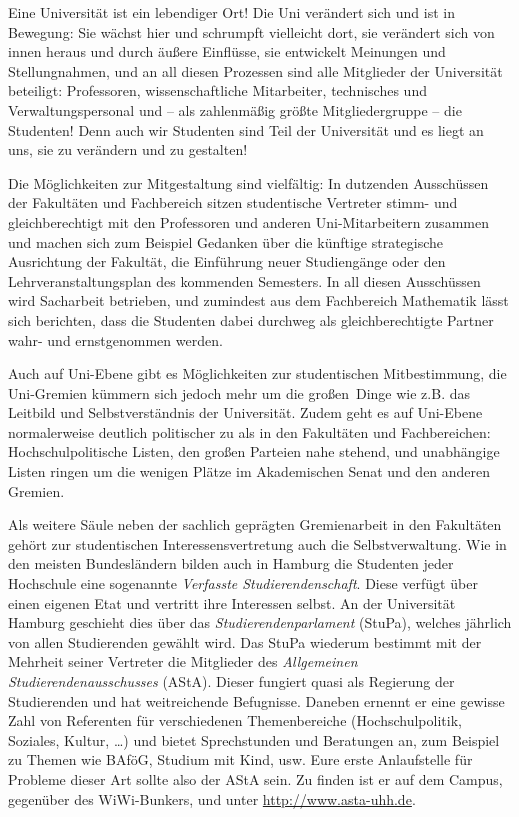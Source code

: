 \label{page:siv}
Eine Universität ist ein lebendiger Ort! Die Uni verändert sich und ist in
Bewegung: Sie wächst hier und schrumpft vielleicht dort, sie verändert sich von
innen heraus und durch äußere Einflüsse, sie entwickelt Meinungen und
Stellungnahmen, und an all diesen Prozessen sind alle Mitglieder der
Universität beteiligt: Professoren, wissenschaftliche Mitarbeiter, technisches
und Verwaltungspersonal und -- als zahlenmäßig größte Mitgliedergruppe -- die
Studenten! Denn auch wir Studenten sind Teil der Universität und es liegt an
uns, sie zu verändern und zu gestalten! 

Die Möglichkeiten zur Mitgestaltung sind vielfältig: In dutzenden Ausschüssen
der Fakultäten und Fachbereich sitzen studentische Vertreter stimm- und
gleichberechtigt mit den Professoren und anderen Uni-Mitarbeitern zusammen und
machen sich zum Beispiel Gedanken über die künftige strategische Ausrichtung
der Fakultät, die Einführung neuer Studiengänge oder den Lehrveranstaltungsplan
des kommenden Semesters. In all diesen Ausschüssen wird Sacharbeit betrieben,
und zumindest aus dem Fachbereich Mathematik lässt sich berichten, dass die
Studenten dabei durchweg als gleichberechtigte Partner wahr- und ernstgenommen
werden. 

Auch auf Uni-Ebene gibt es Möglichkeiten zur studentischen Mitbestimmung, die
Uni-Gremien kümmern sich jedoch mehr um die \glqq großen\grqq\ Dinge wie z.B.
das Leitbild und Selbstverständnis der Universität. Zudem geht es auf Uni-Ebene
normalerweise deutlich politischer zu als in den Fakultäten und Fachbereichen:
Hochschulpolitische Listen, den großen Parteien nahe stehend, und unabhängige
Listen ringen um die wenigen Plätze im Akademischen Senat und den anderen
Gremien.

Als weitere Säule neben der sachlich geprägten Gremienarbeit in den Fakultäten
gehört zur studentischen Interessensvertretung auch die Selbstverwaltung. Wie
in den meisten Bundesländern bilden auch in Hamburg die Studenten jeder
Hochschule eine sogenannte \emph{Verfasste Studierendenschaft}. Diese verfügt
über einen eigenen Etat und vertritt ihre Interessen selbst. An der Universität
Hamburg geschieht dies über das \emph{Studierendenparlament} (StuPa), welches
jährlich von allen Studierenden gewählt wird. Das StuPa wiederum bestimmt mit
der Mehrheit seiner Vertreter die Mitglieder des \emph{Allgemeinen
Studierendenausschusses} (AStA). Dieser fungiert quasi als Regierung der
Studierenden und hat weitreichende Befugnisse. Daneben ernennt er eine gewisse
Zahl von Referenten für verschiedenen Themenbereiche (Hochschulpolitik,
Soziales, Kultur, \ldots) und bietet Sprechstunden und Beratungen an, zum
Beispiel zu Themen wie BAföG, Studium mit Kind, usw. Eure erste Anlaufstelle
für Probleme dieser Art sollte also der AStA sein. Zu finden ist er auf dem
Campus, gegenüber des WiWi-Bunkers, und unter \url{http://www.asta-uhh.de}.



